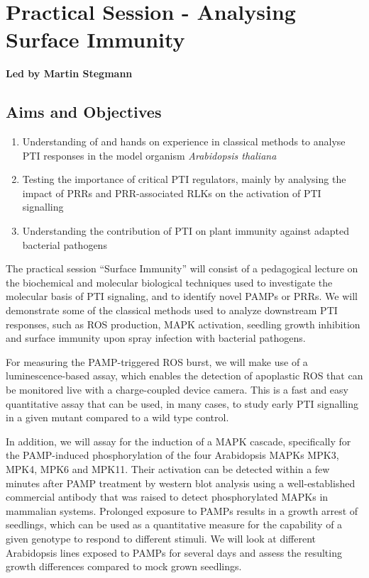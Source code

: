 \documentclass[12pt,]{book}
\providecommand{\tightlist}{%
  \setlength{\itemsep}{0pt}\setlength{\parskip}{0pt}}
\theoremstyle{definition}
\theoremstyle{definition}
\theoremstyle{remark}
\begin{document}
\newpage

\section*{Practical Session - Analysing Surface
Immunity}\label{practical-session---analysing-surface-immunity}

\textbf{Led by Martin Stegmann}

\subsection*{Aims and Objectives}\label{aims-and-objectives-3}

\begin{enumerate}
\def\labelenumi{\arabic{enumi}.}
\tightlist
\item
  Understanding of and hands on experience in classical methods to
  analyse PTI responses in the model organism \emph{Arabidopsis
  thaliana}
\item
  Testing the importance of critical PTI regulators, mainly by analysing
  the impact of PRRs and PRR-associated RLKs on the activation of PTI
  signalling
\item
  Understanding the contribution of PTI on plant immunity against
  adapted bacterial pathogens
\end{enumerate}

The practical session ``Surface Immunity'' will consist of a pedagogical
lecture on the biochemical and molecular biological techniques used to
investigate the molecular basis of PTI signaling, and to identify novel
PAMPs or PRRs. We will demonstrate some of the classical methods used to
analyze downstream PTI responses, such as ROS production, MAPK
activation, seedling growth inhibition and surface immunity upon spray
infection with bacterial pathogens.

For measuring the PAMP-triggered ROS burst, we will make use of a
luminescence-based assay, which enables the detection of apoplastic ROS
that can be monitored live with a charge-coupled device camera. This is
a fast and easy quantitative assay that can be used, in many cases, to
study early PTI signalling in a given mutant compared to a wild type
control.

In addition, we will assay for the induction of a MAPK cascade,
specifically for the PAMP-induced phosphorylation of the four
Arabidopsis MAPKs MPK3, MPK4, MPK6 and MPK11. Their activation can be
detected within a few minutes after PAMP treatment by western blot
analysis using a well-established commercial antibody that was raised to
detect phosphorylated MAPKs in mammalian systems. Prolonged exposure to
PAMPs results in a growth arrest of seedlings, which can be used as a
quantitative measure for the capability of a given genotype to respond
to different stimuli. We will look at different Arabidopsis lines
exposed to PAMPs for several days and assess the resulting growth
differences compared to mock grown seedlings.
\end{document}
